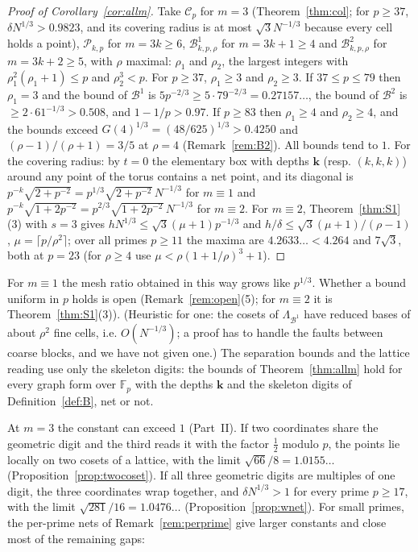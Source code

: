 \documentclass[11pt]{amsart}
\theoremstyle{definition}
\theoremstyle{plain}
\newcommand{\F}{\mathbb{F}}
\begin{document}
\begin{proof}[Proof of Corollary~\ref{cor:allm}]
Take $\mathcal C_p$ for $m=3$ (Theorem~\ref{thm:col}; for $p\ge37$, $\delta N^{1/3}>0.9823$, and its covering radius is at most $\sqrt3N^{-1/3}$ because every cell holds a point), $\mathcal P_{k,p}$ for $m=3k\ge6$, $\mathcal B^1_{k,p,\rho}$ for $m=3k+1\ge4$ and $\mathcal B^2_{k,p,\rho}$ for $m=3k+2\ge5$, with $\rho$ maximal: $\rho_1$ and $\rho_2$, the largest integers with $\rho_1^2(\rho_1+1)\le p$ and $\rho_2^3<p$. For $p\ge37$, $\rho_1\ge3$ and $\rho_2\ge3$. If $37\le p\le79$ then $\rho_1=3$ and the bound of $\mathcal B^1$ is $5p^{-2/3}\ge5\cdot79^{-2/3}=0.27157\ldots$, the bound of $\mathcal B^2$ is $\ge2\cdot61^{-1/3}>0.508$, and $1-1/p>0.97$. If $p\ge83$ then $\rho_1\ge4$ and $\rho_2\ge4$, and the bounds exceed $G(4)^{1/3}=(48/625)^{1/3}>0.4250$ and $(\rho-1)/(\rho+1)=3/5$ at $\rho=4$ (Remark~\ref{rem:B2}). All bounds tend to $1$. For the covering radius: by $t=0$ the elementary box with depths $\mathbf k$ (resp. $(k,k,k)$) around any point of the torus contains a net point, and its diagonal is $p^{-k}\sqrt{2+p^{-2}}=p^{1/3}\sqrt{2+p^{-2}}\,N^{-1/3}$ for $m\equiv1$ and $p^{-k}\sqrt{1+2p^{-2}}=p^{2/3}\sqrt{1+2p^{-2}}\,N^{-1/3}$ for $m\equiv2$. For $m\equiv2$, Theorem~\ref{thm:S1}(3) with $s=3$ gives $hN^{1/3}\le\sqrt3(\mu+1)p^{-1/3}$ and $h/\delta\le\sqrt3(\mu+1)/(\rho-1)$, $\mu=\lceil p/\rho^2\rceil$; over all primes $p\ge11$ the maxima are $4.2633\ldots<4.264$ and $7\sqrt3$, both at $p=23$ (for $\rho\ge4$ use $\mu<\rho(1+1/\rho)^3+1$).
\end{proof}

For $m\equiv1$ the mesh ratio obtained in this way grows like $p^{1/3}$. Whether a bound uniform in $p$ holds is open (Remark~\ref{rem:open}(5); for $m\equiv2$ it is Theorem~\ref{thm:S1}(3)). (Heuristic for one: the cosets of $\Lambda_{\mathcal B^1}$ have reduced bases of about $\rho^2$ fine cells, i.e. $O(N^{-1/3})$; a proof has to handle the faults between coarse blocks, and we have not given one.) The separation bounds and the lattice reading use only the skeleton digits: the bounds of Theorem~\ref{thm:allm} hold for every graph form over $\F_p$ with the depths $\mathbf k$ and the skeleton digits of Definition~\ref{def:B}, net or not.

At $m=3$ the constant can exceed $1$ (Part~II). If two coordinates share the geometric digit and the third reads it with the factor $\frac12$ modulo $p$, the points lie locally on two cosets of a lattice, with the limit $\sqrt{66}/8=1.0155\ldots$ (Proposition~\ref{prop:twocoset}). If all three geometric digits are multiples of one digit, the three coordinates wrap together, and $\delta N^{1/3}>1$ for every prime $p\ge17$, with the limit $\sqrt{281}/16=1.0476\ldots$ (Proposition~\ref{prop:wnet}). For small primes, the per-prime nets of Remark~\ref{rem:perprime} give larger constants and close most of the remaining gaps:
\end{document}
